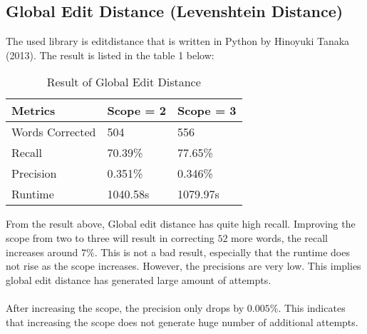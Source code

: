 \documentclass[11pt]{article}
\begin{document}
  \subsection{Global Edit Distance (Levenshtein Distance)}
  The used library is editdistance that is written in Python by Hinoyuki Tanaka
  (2013). The result is listed in the table 1 below:
    \begin{table}[h]
      \begin{center}
        \begin{tabular}{|l|l|l|}
          \hline
          Metrics & Scope = 2 & Scope = 3\\
          \hline\hline
          Words Corrected & 504 & 556\\
          \hline
          Recall & 70.39\% & 77.65\% \\
          \hline
          Precision & 0.351\% & 0.346\% \\
          \hline
          Runtime & 1040.58s & 1079.97s\\
          \hline
        \end{tabular}
        \caption{Result of Global Edit Distance}\label{table1}
      \end{center}
    \end{table}

    From the result above, Global edit distance has quite high recall.
    Improving the scope from two to three will result in correcting $52$ more
    words, the recall increases around $7\%$. This is not a bad result,
    especially that the runtime does not rise as the scope increases.
    However, the precisions are very low. This implies global edit distance
    has generated large amount of attempts.
    \paragraph{}
    After increasing the scope, the precision only drops by $0.005\%$.
    This indicates that increasing the scope does not
    generate huge number of additional attempts.
\end{document}

